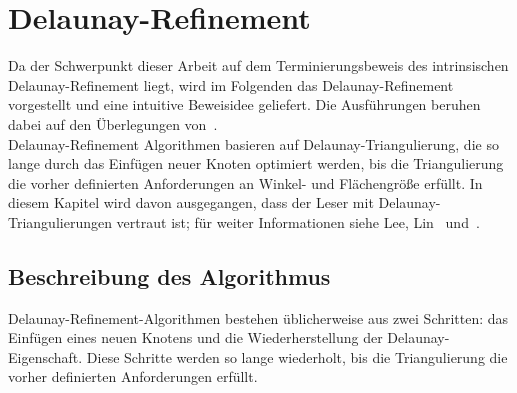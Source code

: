 \chapter{ Delaunay-Refinement }\label{kap:Algorithmus} Da der Schwerpunkt dieser Arbeit auf dem Terminierungsbeweis des intrinsischen Delaunay-Refinement liegt, wird im Folgenden das Delaunay-Refinement vorgestellt und eine intuitive Beweisidee geliefert. Die Ausführungen beruhen dabei auf den Überlegungen von~\citet{shewchuk:1997:delaunay,SHEWCHUK:2002:chuws}.\\
Delaunay-Refinement Algorithmen basieren auf Delaunay-Triangulierung, die so lange durch das Einfügen neuer Knoten optimiert werden, bis die Triangulierung die vorher definierten Anforderungen an Winkel- und Flächengröße erfüllt. In diesem Kapitel wird davon ausgegangen, dass der Leser mit Delaunay-Triangulierungen vertraut ist; für weiter Informationen siehe Lee, Lin~\cite{lee:1986:DelaunayTriangulation} und~\citet{chew:1993:guaranteed}. 


\section*{Beschreibung des Algorithmus}

Delaunay-Refinement-Algorithmen bestehen üblicherweise aus zwei Schritten: das Einfügen eines neuen Knotens und die Wiederherstellung der Delaunay-Eigenschaft.
Diese Schritte  werden so lange wiederholt, bis die Triangulierung die vorher definierten Anforderungen erfüllt.\\ 
  
